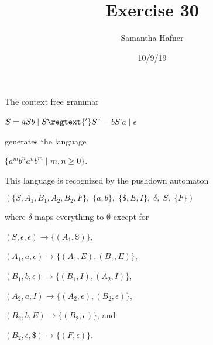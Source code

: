 \documentclass[12pt]{article}
\title{Exercise 30}
\author{Samantha Hafner}
\date{10/9/19}
\begin{document}
\maketitle


The context free grammar
\begin{center}$S = aSb\;\vert\;S\regtext{'}\\S$'$ = bS$'$a\;\vert\;\epsilon$\end{center}

generates the language 

\begin{center}$\{a^m b^n a^n b^m\;|\;m,n\ge0\}$.\end{center}

This language is recognized by the pushdown automaton

\begin{center}$(\{S, A_1, B_1, A_2, B_2, F\},\;\{a, b\},\;\{\$, E, I\},\;\delta,\;S,\;\{F\})$\end{center}

where $\delta$ maps everything to $\emptyset$ except for


\setlength{\parindent}{3em}
$(S,\epsilon,\epsilon) \rightarrow \{(A_1, \$)\}$,

$(A_1,a,\epsilon) \rightarrow \{(A_1, E), (B_1, E)\}$,

$(B_1,b,\epsilon) \rightarrow \{(B_1, I), (A_2, I)\}$,

$(A_2,a,I) \rightarrow \{(A_2, \epsilon), (B_2, \epsilon)\}$,

$(B_2,b,E) \rightarrow \{(B_2, \epsilon)\}$, and

$(B_2,\epsilon,\$) \rightarrow \{(F, \epsilon)\}$.
\end{document}
